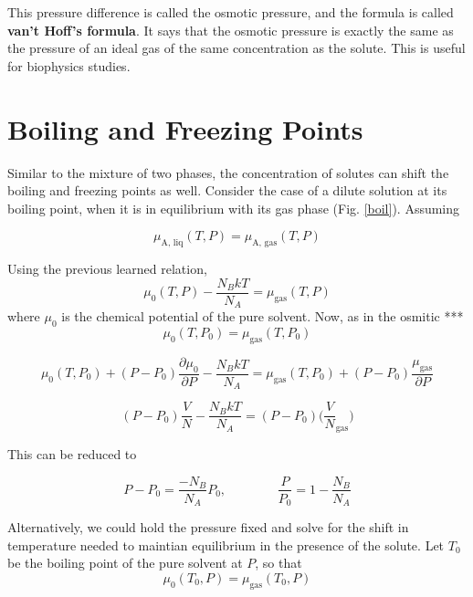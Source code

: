 This pressure difference is called the osmotic pressure, and the formula is called \textbf{van't Hoff's formula}. It says that the osmotic pressure is exactly the same as the pressure of an ideal gas of the same concentration as the solute. This is useful for biophysics studies. 

\section{Boiling and Freezing Points}
Similar to the mixture of two phases, the concentration of solutes can shift the boiling and freezing points as well. Consider the case of a dilute solution at its boiling point, when it is in equilibrium with its gas phase (Fig. \ref{boil}). Assuming

\begin{equation}
    \mu_{\textrm{A, liq}}(T, P) = \mu_{\textrm{A, gas}}(T, P)
\end{equation}

Using the previous learned relation,
\begin{equation}
    \mu_0(T, P) - \frac{N_BkT}{N_A} = \mu_{\textrm{gas}}(T, P)
\end{equation}
where $\mu_0$ is the chemical potential of the pure solvent.
Now, as in the osmitic ***
\begin{equation}
    \mu_0(T, P_0) = \mu_{\textrm{gas}}(T, P_0)
\end{equation}

\begin{equation}
    \mu_0(T, P_0) + (P-P_0) \frac{\partial \mu_0}{\partial P} - \frac{N_BkT}{N_A} = \mu_{\textrm{gas}} (T, P_0) + (P-P_0) \frac{\mu_{\textrm{gas}}}{\partial P}
\end{equation}

\begin{equation}
    (P-P_0) \frac{V}{N} - \frac{N_BkT}{N_A} = (P-P_0) \bigg(\frac{V}{N}_{\textrm{gas}}\bigg)
\end{equation}

This can be reduced to

\begin{equation}
    P - P_0 = \frac{-N_B}{N_A} P_0, ~~~~~~~~~~~~~~~~~~ \frac{P}{P_0} = 1-\frac{N_B}{N_A}
\end{equation}

Alternatively, we could hold the pressure fixed and solve for the shift in temperature needed to maintian equilibrium in the presence of the solute. Let $T_0$ be the boiling point of the pure solvent at $P$, so that
\begin{equation}
    \mu_0(T_0, P) = \mu_{\textrm{gas}}(T_0, P)
\end{equation}

